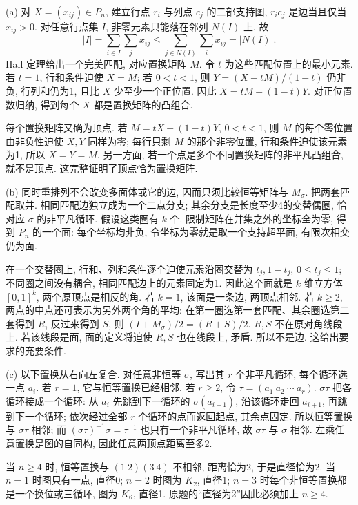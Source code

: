 \begin{solution}
(a) 对 $X=(x_{ij})\in P_n$, 建立行点 $r_i$ 与列点 $c_j$ 的二部支持图,
$r_ic_j$ 是边当且仅当 $x_{ij}>0$.
对任意行点集 $I$, 非零元素只能落在邻列 $N(I)$ 上, 故
\[
|I|=\sum_{i\in I}\sum_jx_{ij}
\le\sum_{j\in N(I)}\sum_ix_{ij}=|N(I)|.
\]
Hall 定理给出一个完美匹配, 对应置换矩阵 $M$.
令 $t$ 为这些匹配位置上的最小元素. 若 $t=1$, 行和条件迫使 $X=M$;
若 $0<t<1$, 则 $Y=(X-tM)/(1-t)$ 仍非负, 行列和仍为1, 且比 $X$ 少至少一个正位置.
因此 $X=tM+(1-t)Y$. 对正位置数归纳, 得到每个 $X$ 都是置换矩阵的凸组合.

每个置换矩阵又确为顶点. 若 $M=tX+(1-t)Y$, $0<t<1$,
则 $M$ 的每个零位置由非负性迫使 $X,Y$ 同样为零;
每行只剩 $M$ 的那个非零位置, 行和条件迫使该元素为1, 所以 $X=Y=M$.
另一方面, 若一个点是多个不同置换矩阵的非平凡凸组合, 就不是顶点.
这完整证明了顶点恰为置换矩阵.

(b) 同时重排列不会改变多面体或它的边, 因而只须比较恒等矩阵与 $M_\sigma$.
把两套匹配取并. 相同匹配边独立成为一个二点分支;
其余分支是长度至少4的交替偶圈, 恰对应 $\sigma$ 的非平凡循环.
假设这类圈有 $k$ 个. 限制矩阵在并集之外的坐标全为零,
得到 $P_n$ 的一个面: 每个坐标均非负, 令坐标为零就是取一个支持超平面,
有限次相交仍为面.

在一个交替圈上, 行和、列和条件逐个迫使元素沿圈交替为 $t_j,1-t_j$,
$0\le t_j\le1$; 不同圈之间没有耦合, 相同匹配边上的元素固定为1.
因此这个面就是 $k$ 维立方体 $[0,1]^k$, 两个原顶点是相反的角.
若 $k=1$, 该面是一条边, 两顶点相邻.
若 $k\ge2$, 两点的中点还可表示为另外两个角的平均:
在第一圈选第一套匹配、其余圈选第二套得到 $R$,
反过来得到 $S$, 则 $(I+M_\sigma)/2=(R+S)/2$.
$R,S$ 不在原对角线段上. 若该线段是面, 面的定义将迫使 $R,S$ 也在线段上,
矛盾. 所以不是边. 这给出要求的充要条件.

(c) 以下置换从右向左复合. 对任意非恒等 $\sigma$, 写出其 $r$ 个非平凡循环,
每个循环选一点 $a_i$. 若 $r=1$, 它与恒等置换已经相邻.
若 $r\ge2$, 令 $\tau=(a_1\ a_2\ \cdots\ a_r)$.
$\sigma\tau$ 把各循环接成一个循环: 从 $a_i$ 先跳到下一循环的
$\sigma(a_{i+1})$, 沿该循环走回 $a_{i+1}$, 再跳到下一个循环;
依次经过全部 $r$ 个循环的点而返回起点, 其余点固定.
所以恒等置换与 $\sigma\tau$ 相邻;
而 $(\sigma\tau)^{-1}\sigma=\tau^{-1}$ 也只有一个非平凡循环,
故 $\sigma\tau$ 与 $\sigma$ 相邻. 左乘任意置换是图的自同构,
因此任意两顶点距离至多2.

当 $n\ge4$ 时, 恒等置换与 $(1\ 2)(3\ 4)$ 不相邻, 距离恰为2,
于是直径恰为2. 当 $n=1$ 时图只有一点, 直径0;
$n=2$ 时图为 $K_2$, 直径1;
$n=3$ 时每个非恒等置换都是一个换位或三循环, 图为 $K_6$, 直径1.
原题的“直径为2”因此必须加上 $n\ge4$.


\end{solution}
